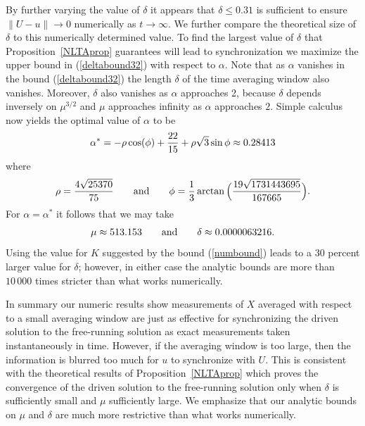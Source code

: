 \documentclass[master,tocprelim,12pt]{unrthesis}
\theoremstyle{definition}
\def\wwords#1{\qquad\hbox{#1}\qquad}
\numberwithin{equation}{chapter}
\begin{document}
\begin{manuscript}
By further varying the value of $\delta$ it appears that
$\delta\le 0.31$ is sufficient to ensure
$\|U-u\|\to 0$ numerically as $t\to\infty$.
We further compare the theoretical size of $\delta$ to 
this numerically determined value.
To find the largest value of $\delta$ that Proposition~\ref{NLTAprop} 
guarantees will lead to synchronization
we maximize the upper bound in 
(\ref{deltabound32}) with respect to $\alpha$.
Note that as $\alpha$ vanishes in the bound (\ref{deltabound32}) 
the length $\delta$ of the time averaging window also 
vanishes.  Moreover, $\delta$ also vanishes as 
$\alpha$ approaches 2,
because $\delta$ depends inversely on $\mu^{3/2}$ and
$\mu$ approaches infinity as $\alpha$ approaches $2$.
Simple
calculus now yields the optimal value of $\alpha$ to be
$$
  \alpha^*=-\rho\cos(\phi)+{22\over 15}+\rho\sqrt3\sin\phi
      \approx 0.28413
$$
where
$$
  \rho={4\sqrt{25370}\over 75}
\wwords{and}
  \phi={1\over 3}\arctan\Big({19\sqrt{1731443695}\over167665}\Big).
$$
For $\alpha=\alpha^*$ it follows that we may take
$$
  \mu\approx 513.153\wwords{and}\delta\approx 0.0000063216.
$$
Using the value for $K$ suggested by the bound 
(\ref{numbound}) leads to a 30 percent larger value for $\delta$;
however, in either case the analytic bounds are more than $10\,000$
times stricter than what works numerically.

In summary our numeric results show
measurements of $X$ averaged with respect to a small
averaging window are just as effective for synchronizing the
driven solution to the free-running solution as exact
measurements taken instantaneously in time.  However, if
the averaging window is too large, then the information is
blurred too much for $u$ to synchronize with $U$.
This is consistent with the theoretical results of
Proposition~\ref{NLTAprop} which proves the
convergence of the driven solution to the free-running
solution only when $\delta$ is sufficiently small and $\mu$
sufficiently large.
We emphasize that our analytic bounds on $\mu$ and $\delta$
are much more restrictive than what works numerically.


\end{manuscript}
\end{document}
